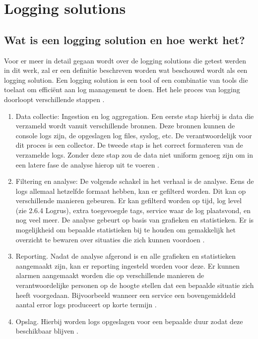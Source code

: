 \section{Logging solutions}
\label{sec:logging-solutions}

\subsection{Wat is een logging solution en hoe werkt het?}
Voor er meer in detail gegaan wordt over de logging solutions die getest werden in dit werk, zal er een definitie beschreven worden wat beschouwd wordt als een logging solution.
Een logging solution is een tool of een combinatie van tools die toelaat om efficiënt aan log management te doen. Het hele proces van logging doorloopt verschillende stappen \autocite{logdna2018}. 

\begin{enumerate}
    \item Data collectie: Ingestion en log aggregation. Een eerste stap hierbij is data die verzameld wordt vanuit verschillende bronnen. Deze bronnen kunnen de console logs zijn, de opgeslagen log files, syslog, etc. De verantwoordelijk voor dit proces is een collector. De tweede stap is het correct formateren van de verzamelde logs. Zonder deze stap zou de data niet uniform genoeg zijn om in een latere fase de analyse hierop uit te voeren \autocite{logdna2018}. 
    \item Filtering en analyse: De volgende schakel in het verhaal is de analyse. Eens de logs allemaal hetzelfde formaat hebben, kan er gefilterd worden. Dit kan op verschillende manieren gebeuren. Er kan gefilterd worden op tijd, log level (zie 2.6.4 Logrus), extra toegevoegde tags, service waar de log plaatsvond, en nog veel meer. De analyse gebeurt op basis van grafieken en statistieken. Er is mogelijkheid om bepaalde statistieken bij te houden om gemakkelijk het overzicht te bewaren over situaties die zich kunnen voordoen  \autocite{logdna2018}.
    \item Reporting. Nadat de analyse afgerond is en alle grafieken en statistieken aangemaakt zijn, kan er reporting ingesteld worden voor deze. Er kunnen alarmen aangemaakt worden die op verschillende manieren de verantwoordelijke personen op de hoogte stellen dat een bepaalde situatie zich heeft voorgedaan. Bijvoorbeeld wanneer een service een bovengemiddeld aantal error logs produceert op korte termijn  \autocite{logdna2018}.
    \item Opslag. Hierbij worden logs opgeslagen voor een bepaalde duur zodat deze beschikbaar blijven  \autocite{logdna2018}.
\end{enumerate}

